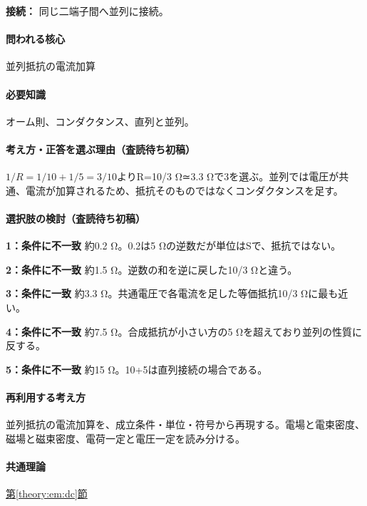 \noindent\textbf{接続：} 同じ二端子間へ並列に接続。\par

\paragraph{問われる核心} 並列抵抗の電流加算

\paragraph{必要知識} オーム則、コンダクタンス、直列と並列。

\paragraph{考え方・正答を選ぶ理由（査読待ち初稿）} \(1/R=1/10+1/5=3/10\)よりR=\allowbreak{}10/3 Ω≃3.3 Ωで3を選ぶ。並列では電圧が共通、電流が加算されるため、抵抗そのものではなくコンダクタンスを足す。

\paragraph{選択肢の検討（査読待ち初稿）}\mbox{}\par

\noindent\textbf{1：条件に不一致} 約0.2 Ω。0.2は5 Ωの逆数だが単位はSで、抵抗ではない。\par

\noindent\textbf{2：条件に不一致} 約1.5 Ω。逆数の和を逆に戻した10/3 Ωと違う。\par

\noindent\textbf{3：条件に一致} 約3.3 Ω。共通電圧で各電流を足した等価抵抗10/3 Ωに最も近い。\par

\noindent\textbf{4：条件に不一致} 約7.5 Ω。合成抵抗が小さい方の5 Ωを超えており並列の性質に反する。\par

\noindent\textbf{5：条件に不一致} 約15 Ω。10+5は直列接続の場合である。\par

\paragraph{再利用する考え方} 並列抵抗の電流加算を、成立条件・単位・符号から再現する。電場と電束密度、磁場と磁束密度、電荷一定と電圧一定を読み分ける。

\paragraph{共通理論} \hyperref[theory:em:dc]{第\ref*{theory:em:dc}節}

